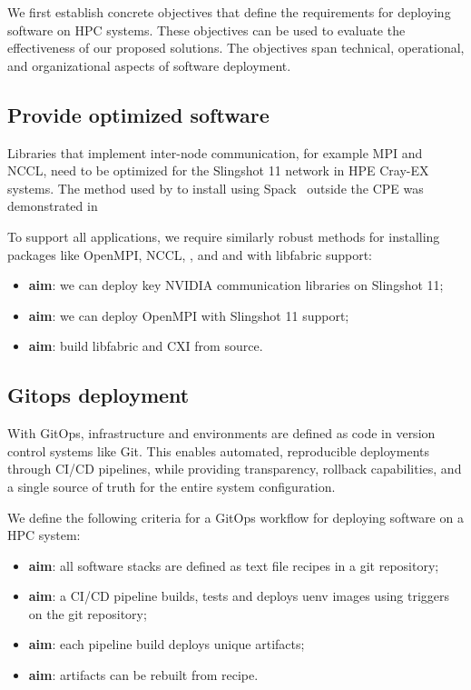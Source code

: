 We first establish concrete objectives that define the requirements for deploying software on HPC systems. These objectives can be used to evaluate the effectiveness of our proposed solutions. The objectives span technical, operational, and organizational aspects of software deployment.

\subsection{Provide optimized software}

Libraries that implement inter-node communication, for example MPI and NCCL, need to be optimized for the Slingshot 11 network in HPE Cray-EX systems.
The method used by \stackinator to install \craympich using Spack~\cite{gamblin:sc15} outside the CPE was demonstrated in~\cite{uenv2023} 

To support all applications, we require similarly robust methods for installing packages like OpenMPI, NCCL, \nvshmem, \cufftmp and \cusolvermp and with libfabric support:
\begin{itemize}
    \item \textbf{aim}: we can deploy key NVIDIA communication libraries on Slingshot 11;
    \item \textbf{aim}: we can deploy OpenMPI with Slingshot 11 support;
    \item \textbf{aim}: build libfabric and CXI from source.
\end{itemize}

\subsection{Gitops deployment}

With GitOps, infrastructure and environments are defined as code in version control systems like Git.
This enables automated, reproducible deployments through CI/CD pipelines, while providing transparency, rollback capabilities, and a single source of truth for the entire system configuration.

We define the following criteria for a GitOps workflow for deploying software on a HPC system:
\begin{itemize}
    \item \textbf{aim}: all software stacks are defined as text file recipes in a git repository;
    \item \textbf{aim}: a CI/CD pipeline builds, tests and deploys uenv images using triggers on the git repository;
    \item \textbf{aim}: each pipeline build deploys unique artifacts;
    \item \textbf{aim}: artifacts can be rebuilt from recipe.
\end{itemize}

